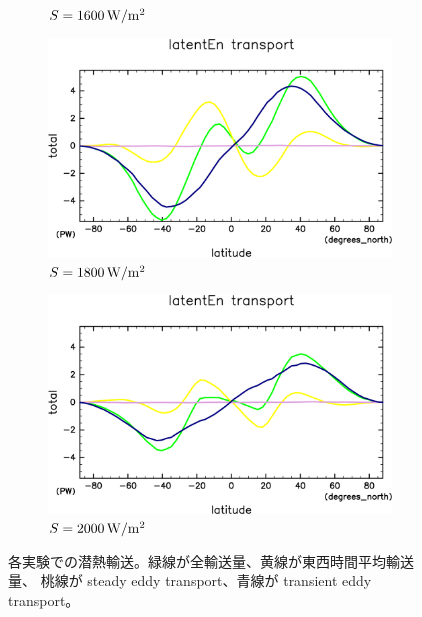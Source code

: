 \documentclass[body]{subfiles}
\begin{document}
\begin{figure}[t]
\begin{subfigure}{.4\textwidth}
		\caption{\(S=1600\hmu{W/m^2}\)}
	\end{subfigure}
	\begin{subfigure}{.4\textwidth}
		\centering
		\includegraphics[width=\columnwidth]{S1800/MeriHeatTrans@latentEn,time=3650:4015-crop-rotate.pdf}
		\caption{\(S=1800\hmu{W/m^2}\)}
	\end{subfigure}
	\begin{subfigure}{.4\textwidth}
		\centering
		\includegraphics[width=\columnwidth]{S2000/MeriHeatTrans@latentEn,time=7300:7665-crop-rotate.pdf}
		\caption{\(S=2000\hmu{W/m^2}\)}
	\end{subfigure}
	\caption{
		各実験での潜熱輸送。緑線が全輸送量、黄線が東西時間平均輸送量、
		桃線が steady eddy transport、青線が transient eddy transport。
	}
\end{figure}
\end{document}
